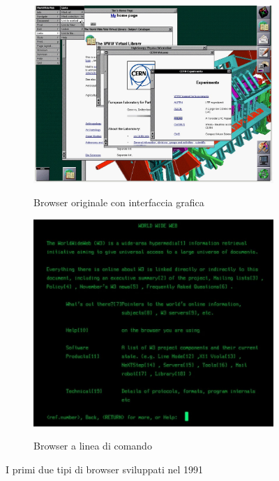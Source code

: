 \begin{figure}[h]
\begin{subfigure}{0.5\textwidth}
\includegraphics[width=\textwidth]{images/primo browser.jpg} 
\caption{Browser originale con interfaccia grafica}
\label{fig:browserOriginale}
\cite{primoBrowser}
\end{subfigure} \hspace*{\fill}
\begin{subfigure}{0.5\textwidth}
\includegraphics[width=\textwidth]{images/primo browser command line.jpg}
\caption{Browser a linea di comando}
\label{fig:browserCommandLine}
\cite{browserLineaDiComando}
\end{subfigure}

\caption{I primi due tipi di browser sviluppati nel 1991}
\label{fig:image2}
\end{figure}
\newpage
